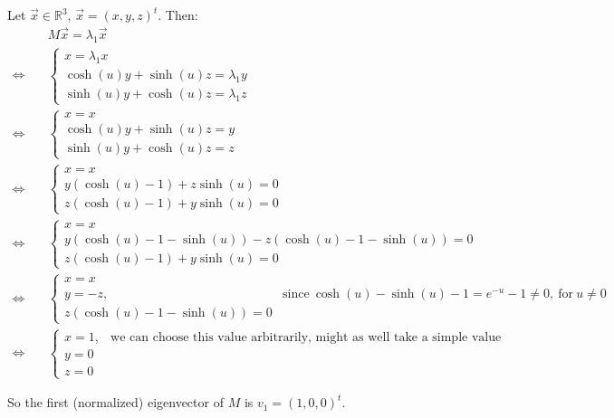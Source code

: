\documentclass{article}
\begin{document}
Let $\Vec{x} \in \mathbb{R}^3$, $\Vec{x} = (x,y,z)^t$. Then:
\begin{align*}
    &M \Vec{x} = \lambda_1 \Vec{x} \\
    \Leftrightarrow \quad &\begin{cases}
        x = \lambda_1 x \\
        \cosh(u)y + \sinh(u)z = \lambda_1 y \\
        \sinh(u)y + \cosh(u)z = \lambda_1 z
    \end{cases} \\
    \Leftrightarrow \quad &\begin{cases}
        x = x \\
        \cosh(u)y + \sinh(u)z = y \\
        \sinh(u)y + \cosh(u)z = z
    \end{cases} \\
    \Leftrightarrow \quad &\begin{cases}
        x = x \\
        y(\cosh(u) - 1) + z \sinh(u) = 0 \\
        z(\cosh(u) - 1) + y \sinh(u) = 0
    \end{cases} \\
    \Leftrightarrow \quad &\begin{cases}
        x = x \\
        y(\cosh(u) - 1 - \sinh(u)) - z( \cosh(u) - 1 - \sinh(u))  = 0 \\
        z(\cosh(u) - 1) + y \sinh(u) = 0
    \end{cases} \\
    \Leftrightarrow \quad &\begin{cases}
        x = x \\
        y = -z, &\text{since} \ \cosh(u)-\sinh(u)-1 = e^{-u}-1 \neq 0, \ \text{for} \ u \neq 0\\
        z(\cosh(u) - 1 - \sinh(u)) = 0
    \end{cases} \\
    \Leftrightarrow \quad &\begin{cases}
        x = 1, & \text{we can choose this value arbitrarily, might as well take a simple value} \\
        y = 0 \\
        z = 0
    \end{cases} 
\end{align*}

So the first (normalized) eigenvector of $M$ is $v_1 = (1,0,0)^t$.
\end{document}
